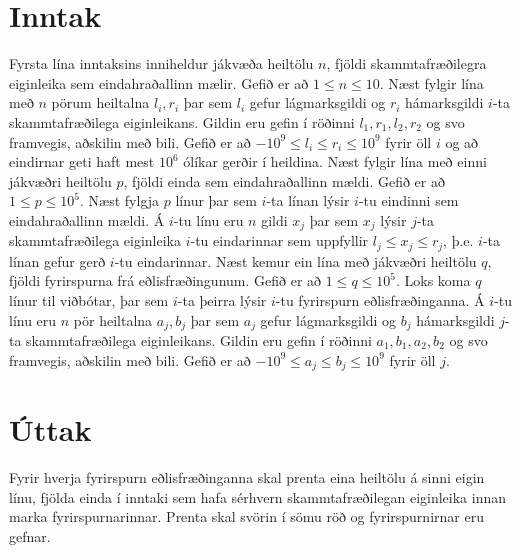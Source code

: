 \section*{Inntak}
Fyrsta lína inntaksins inniheldur jákvæða heiltölu $n$,
fjöldi skammtafræðilegra eiginleika sem eindahraðallinn
mælir. Gefið er að $1 \leq n \leq 10$.
Næst fylgir lína með $n$ pörum heiltalna $l_i, r_i$ þar sem
$l_i$ gefur lágmarksgildi og $r_i$ hámarksgildi
$i$-ta skammtafræðilega eiginleikans. Gildin eru gefin í
röðinni $l_1, r_1, l_2, r_2$ og svo framvegis, aðskilin
með bili. Gefið er að $-10^9 \leq l_i \leq r_i \leq 10^9$ 
fyrir öll $i$ og að eindirnar geti haft mest $10^6$ ólíkar
gerðir í heildina.
Næst fylgir lína með einni jákvæðri heiltölu $p$, fjöldi
einda sem eindahraðallinn mældi. Gefið er að
$1 \leq p \leq 10^5$.
Næst fylgja $p$ línur þar sem $i$-ta línan lýsir $i$-tu
eindinni sem eindahraðallinn mældi.
Á $i$-tu línu eru $n$ gildi $x_j$ þar sem $x_j$ lýsir
$j$-ta skammtafræðilega eiginleika $i$-tu eindarinnar sem
uppfyllir $l_j \leq x_j \leq r_j$, þ.e. $i$-ta línan
gefur gerð $i$-tu eindarinnar.
Næst kemur ein lína með jákvæðri heiltölu $q$, fjöldi
fyrirspurna frá eðlisfræðingunum. Gefið er að
$1 \leq q \leq 10^5$.
Loks koma $q$ línur til viðbótar, þar sem $i$-ta þeirra
lýsir $i$-tu fyrirspurn eðlisfræðinganna.
Á $i$-tu línu eru $n$ pör heiltalna $a_j, b_j$ þar sem
$a_j$ gefur lágmarksgildi og $b_j$ hámarksgildi
$j$-ta skammtafræðilega eiginleikans. Gildin eru gefin í
röðinni $a_1, b_1, a_2, b_2$ og svo framvegis, aðskilin
með bili. Gefið er að $-10^9 \leq a_j \leq b_j \leq 10^9$
fyrir öll $j$.

\section*{Úttak}
Fyrir hverja fyrirspurn eðlisfræðinganna skal prenta eina
heiltölu á sinni eigin línu, fjölda einda í inntaki sem
hafa sérhvern skammtafræðilegan eiginleika innan marka
fyrirspurnarinnar. Prenta skal svörin í sömu röð og
fyrirspurnirnar eru gefnar.
